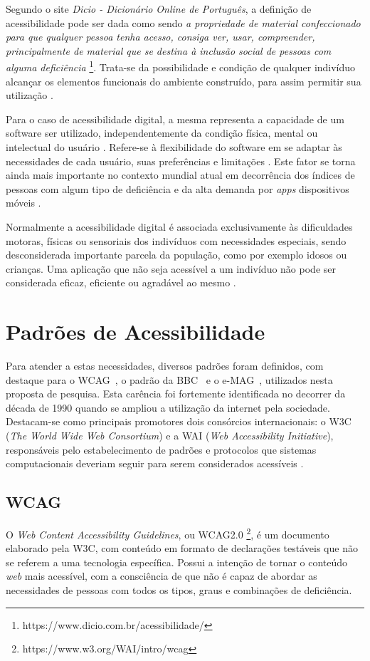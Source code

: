 
Segundo o site \textit{Dicio - Dicionário Online de Português}, a definição de acessibilidade pode ser dada como sendo \textit{a propriedade de material confeccionado para que qualquer pessoa tenha acesso, consiga ver, usar, compreender, principalmente de material que se destina à inclusão social de pessoas com alguma deficiência} \footnote{https://www.dicio.com.br/acessibilidade/}. Trata-se da possibilidade e condição de qualquer indivíduo alcançar os elementos funcionais do ambiente construído, para assim permitir sua utilização \cite{camilamaster}.

Para o caso de acessibilidade digital, a mesma representa a capacidade de um software ser utilizado, independentemente da condição física, mental ou intelectual do usuário \cite{w3cwai}. Refere-se à flexibilidade do software em se adaptar às necessidades de cada usuário, suas preferências e limitações \cite{camilamaster}. Este fator se torna ainda mais importante no contexto mundial atual em decorrência dos índices de pessoas com algum tipo de deficiência e da alta demanda por \textit{apps} dispositivos móveis \cite{storeanalysis}.

Normalmente a acessibilidade digital é associada exclusivamente às dificuldades motoras, físicas ou sensoriais dos indivíduos com necessidades especiais, sendo desconsiderada importante parcela da população, como por exemplo idosos ou crianças. Uma aplicação que não seja acessível a um indivíduo não pode ser considerada eficaz, eficiente ou agradável ao mesmo \cite{santarosa}.

\section{Padrões de Acessibilidade}
Para atender a estas necessidades, diversos padrões foram definidos, com destaque para o WCAG~\cite{wcag}, o padrão da BBC~\cite{bbc} e o e-MAG~\cite{emag}, utilizados nesta proposta de pesquisa. Esta carência foi fortemente identificada no decorrer da década de 1990 quando se ampliou a utilização da internet pela sociedade. Destacam-se como principais promotores dois consórcios internacionais: o W3C (\textit{The World Wide Web Consortium}) e a WAI (\textit{Web Accessibility Initiative}), responsáveis pelo estabelecimento de padrões e protocolos que sistemas computacionais deveriam seguir para serem considerados acessíveis \cite{passerino}.

\subsection{WCAG}
O \textit{Web Content Accessibility Guidelines}, ou WCAG2.0 \footnote{https://www.w3.org/WAI/intro/wcag}, é um documento elaborado pela W3C, com conteúdo em formato de declarações testáveis que não se referem a uma tecnologia específica. Possui a intenção de tornar o conteúdo \textit{web} mais acessível, com a consciência de que não é capaz de abordar as necessidades de pessoas com todos os tipos, graus e combinações de deficiência.


